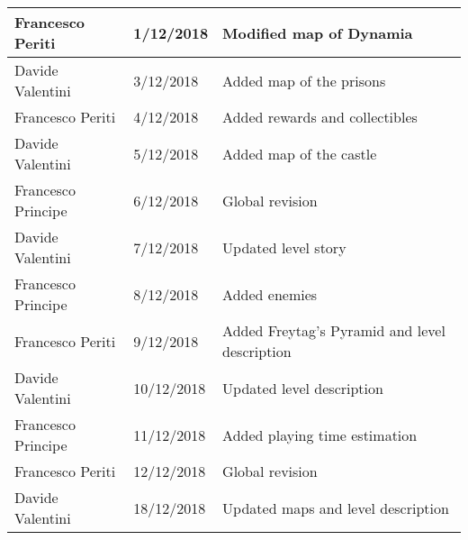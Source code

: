 \begin{longtable}[H]{|l|l|l|}
Francesco Periti & 1/12/2018 & Modified map of Dynamia \\ \hline
Davide Valentini & 3/12/2018 & Added map of the prisons \\ \hline
Francesco Periti & 4/12/2018 & Added rewards and collectibles \\ \hline
Davide Valentini & 5/12/2018 & Added map of the castle \\ \hline
Francesco Principe & 6/12/2018 & Global revision \\ \hline
Davide Valentini & 7/12/2018 & Updated level story \\ \hline
Francesco Principe & 8/12/2018 & Added enemies \\ \hline
Francesco Periti & 9/12/2018 & Added Freytag's Pyramid and level description \\ \hline
Davide Valentini & 10/12/2018 & Updated level description \\ \hline
Francesco Principe & 11/12/2018 & Added playing time estimation \\ \hline
Francesco Periti & 12/12/2018 & Global revision \\ \hline
Davide Valentini & 18/12/2018 & Updated maps and level description \\ \hline
\end{longtable}
